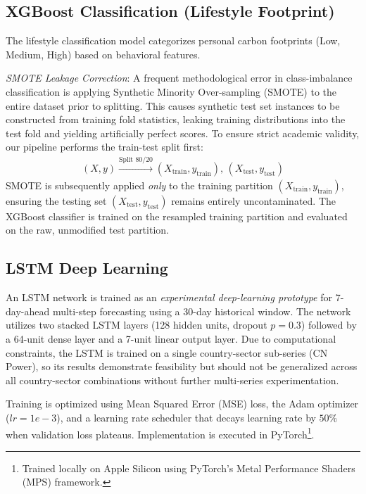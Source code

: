 \documentclass[conference]{IEEEtran}
\begin{document}
\subsection{XGBoost Classification (Lifestyle Footprint)}
The lifestyle classification model categorizes personal carbon footprints (Low, Medium, High) based on behavioral features. 

\textit{SMOTE Leakage Correction}: A frequent methodological error in class-imbalance classification is applying Synthetic Minority Over-sampling (SMOTE) \cite{smote2002} to the entire dataset prior to splitting. This causes synthetic test set instances to be constructed from training fold statistics, leaking training distributions into the test fold and yielding artificially perfect scores. To ensure strict academic validity, our pipeline performs the train-test split first:
\begin{align}
(X, y) \xrightarrow{\text{Split 80/20}} (X_{\text{train}}, y_{\text{train}}), \, (X_{\text{test}}, y_{\text{test}})
\end{align}
SMOTE is subsequently applied \textit{only} to the training partition $(X_{\text{train}}, y_{\text{train}})$, ensuring the testing set $(X_{\text{test}}, y_{\text{test}})$ remains entirely uncontaminated. The XGBoost classifier is trained on the resampled training partition and evaluated on the raw, unmodified test partition.

\subsection{LSTM Deep Learning}
\label{sec:lstm}
An LSTM network \cite{lstm_energy} is trained as an \textit{experimental deep-learning prototype} for 7-day-ahead multi-step forecasting using a 30-day historical window. The network utilizes two stacked LSTM layers (128 hidden units, dropout $p=0.3$) followed by a 64-unit dense layer and a 7-unit linear output layer. Due to computational constraints, the LSTM is trained on a single country-sector sub-series (CN Power), so its results demonstrate feasibility but should not be generalized across all country-sector combinations without further multi-series experimentation.

Training is optimized using Mean Squared Error (MSE) loss, the Adam optimizer ($lr=1e-3$), and a learning rate scheduler that decays learning rate by $50\%$ when validation loss plateaus. Implementation is executed in PyTorch\footnote{Trained locally on Apple Silicon using PyTorch's Metal Performance Shaders (MPS) framework.}.
\end{document}
